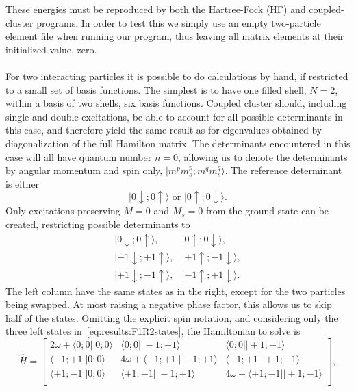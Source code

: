 These energies must be reproduced by both the Hartree-Fock (HF) and coupled-cluster programs. 
In order to test this we simply use an empty two-particle element file when running our program, thus leaving all matrix elements at their initialized value, zero.


\paragraph{}
For two interacting particles it is possible to do calculations by hand, if restricted to a small set of basis functions.
The simplest is to have one filled shell, $N=2$, within a basis of two shells, six basis functions.
Coupled cluster should, including single and double excitations, be able to account for all possible determinants in this case, and therefore yield the same result as for eigenvalues obtained by diagonalization of the full Hamilton matrix.
The determinants encountered in this case will all have quantum number $n=0$, allowing us to denote the determinants by angular momentum and spin only, $|m^pm_s^p;m^qm_s^q\rangle$. 
The reference determinant is either 
\begin{equation}
|0\downarrow;0\uparrow\rangle \textrm{ or } |0\uparrow;0\downarrow\rangle .
\end{equation}
Only excitations preserving $M=0$ and $M_s=0$ from the ground state can be created, restricting possible determinants to 
\begin{equation}
\label{eq:results:F1R2states}
\begin{matrix}
|0\downarrow;0\uparrow\rangle ,  &  |0\uparrow;0\downarrow\rangle , \\
|-1\downarrow;+1\uparrow\rangle , & |+1\uparrow;-1\downarrow\rangle , \\
|+1\downarrow;-1\uparrow\rangle ,  &  |-1\uparrow;+1\downarrow\rangle . 
\end{matrix}
\end{equation}
The left column have the same states as in the right, except for the two particles being swapped.
At most raising a negative phase factor, this allows us to skip half of the states.
Omitting the explicit spin notation, and considering only the three left states in~\eqref{eq:results:F1R2states}, the Hamiltonian to solve is
\begin{equation}
\hat{H}
=
\begin{bmatrix}
2\omega + \langle 0;0||0;0\rangle 
   &  \langle 0;0||-1;+1\rangle  
   & \langle 0;0||+1;-1\rangle \\
\langle-1;+1||0;0\rangle 
   & 4\omega + \langle-1;+1||-1;+1\rangle 
   &  \langle-1;+1||+1;-1\rangle    \\
\langle+1;-1||0;0\rangle 
   & \langle+1;-1||-1;+1\rangle 
   & 4\omega + \langle+1;-1||+1;-1\rangle    \\
\end{bmatrix} , 
\end{equation}
